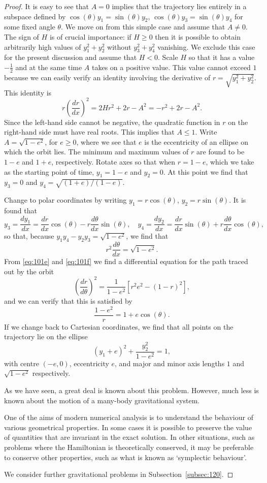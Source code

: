 \begin{proof}
It is easy to see that $A = 0$ implies that the trajectory lies entirely in a subspace defined by $\cos(\theta) y_1 = \sin(\theta) y_2$, $\cos(\theta) y_3 = \sin(\theta) y_4$ for some fixed angle $\theta$. We move on from this simple case and assume that $A \neq 0$. The sign of $H$ is of crucial importance: if $H \geq 0$ then it is possible to obtain arbitrarily high values of $y_1^2 + y_2^2$ without $y_3^2 + y_4^2$ vanishing. We exclude this case for the present discussion and assume that $H < 0$. Scale $H$ so that it has a value $-\frac{1}{2}$ and at the same time $A$ takes on a positive value. This value cannot exceed $1$ because we can easily verify an identity involving the derivative of $r = \sqrt{y_1^2 + y_2^2}$. This identity is
\[
r \left( \frac{dr}{dx} \right)^2 = 2H r^2 + 2r - A^2 = -r^2 + 2r - A^2. \tag{101e}
\]
Since the left-hand side cannot be negative, the quadratic function in $r$ on the right-hand side must have real roots. This implies that $A \leq 1$. Write $A = \sqrt{1 - e^2}$, for $e \geq 0$, where we see that $e$ is the eccentricity of an ellipse on which the orbit lies. The minimum and maximum values of $r$ are found to be $1 - e$ and $1 + e$, respectively. Rotate axes so that when $r = 1 - e$, which we take as the starting point of time, $y_1 = 1 - e$ and $y_2 = 0$. At this point we find that $y_3 = 0$ and $y_4 = \sqrt{(1 + e)/(1 - e)}$.

Change to polar coordinates by writing $y_1 = r \cos(\theta)$, $y_2 = r \sin(\theta)$. It is found that
\[
y_3 = \frac{dy_1}{dx} = \frac{dr}{dx} \cos(\theta) - r \frac{d\theta}{dx} \sin(\theta), \quad y_4 = \frac{dy_2}{dx} = \frac{dr}{dx} \sin(\theta) + r \frac{d\theta}{dx} \cos(\theta),
\]
so that, because $y_1 y_4 - y_2 y_3 = \sqrt{1 - e^2}$, we find that
\[
r^2 \frac{d\theta}{dx} = \sqrt{1 - e^2}. \tag{101f}
\]
From \eqref{eq:101e} and \eqref{eq:101f} we find a differential equation for the path traced out by the orbit
\[
\left( \frac{dr}{d\theta} \right)^2 = \frac{1}{1 - e^2} \left[ r^2 e^2 - (1 - r)^2 \right],
\]
and we can verify that this is satisfied by
\[
\frac{1 - e^2}{r} = 1 + e \cos(\theta).
\]
If we change back to Cartesian coordinates, we find that all points on the trajectory lie on the ellipse
\[
(y_1 + e)^2 + \frac{y_2^2}{1 - e^2} = 1,
\]
with centre $(-e, 0)$, eccentricity $e$, and major and minor axis lengths $1$ and $\sqrt{1 - e^2}$ respectively.

As we have seen, a great deal is known about this problem. However, much less is known about the motion of a many-body gravitational system.

One of the aims of modern numerical analysis is to understand the behaviour of various geometrical properties. In some cases it is possible to preserve the value of quantities that are invariant in the exact solution. In other situations, such as problems where the Hamiltonian is theoretically conserved, it may be preferable to conserve other properties, such as what is known as `symplectic behaviour'.

We consider further gravitational problems in Subsection~\ref{subsec:120}.
\end{proof}

